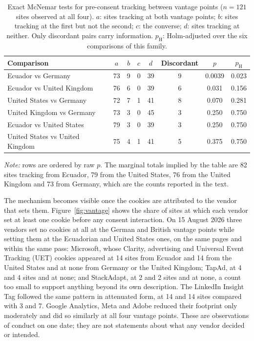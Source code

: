\documentclass[pdflatex,sn-basic,Numbered,iicol]{sn-jnl}
\theoremstyle{thmstyleone}
\theoremstyle{thmstyletwo}
\theoremstyle{thmstylethree}
\begin{document}
	\begin{table}[htbp]
		\centering
		\caption{Exact McNemar tests for pre-consent tracking between vantage points ($n=121$ sites observed at all four). $a$: sites tracking at both vantage points; $b$: sites tracking at the first but not the second; $c$: the converse; $d$: sites tracking at neither. Only discordant pairs carry information. $p_{\text{H}}$: Holm-adjusted over the six comparisons of this family.}\label{tab:vantage}
		\small
		\begin{tabular}{@{}lccccccc@{}}
			\toprule
			\textbf{Comparison} & $a$ & $b$ & $c$ & $d$ & \textbf{Discordant} & \textbf{$p$} & \textbf{$p_{\text{H}}$} \\
			\midrule
			Ecuador vs Germany & 73 & 9 & 0 & 39 & 9 & 0.0039 & 0.023 \\
			Ecuador vs United Kingdom & 76 & 6 & 0 & 39 & 6 & 0.031 & 0.156 \\
			United States vs Germany & 72 & 7 & 1 & 41 & 8 & 0.070 & 0.281 \\
			United Kingdom vs Germany & 73 & 3 & 0 & 45 & 3 & 0.250 & 0.750 \\
			Ecuador vs United States & 79 & 3 & 0 & 39 & 3 & 0.250 & 0.750 \\
			United States vs United Kingdom & 75 & 4 & 1 & 41 & 5 & 0.375 & 0.750 \\
			\bottomrule
		\end{tabular}
		\par\vspace{3pt}
		\footnotesize\RaggedRight\textit{Note:} rows are ordered by raw $p$. The marginal totals implied by the table are 82 sites tracking from Ecuador, 79 from the United States, 76 from the United Kingdom and 73 from Germany, which are the counts reported in the text.
	\end{table}
	
	The mechanism becomes visible once the cookies are attributed to the vendor that sets them. Figure~\ref{fig:vantage} shows the share of sites at which each vendor set at least one cookie before any consent interaction. On 15 August 2026 three vendors set no cookies at all at the German and British vantage points while setting them at the Ecuadorian and United States ones, on the same pages and within the same pass: Microsoft, whose Clarity, advertising and Universal Event Tracking (UET) cookies appeared at 14 sites from Ecuador and 14 from the United States and at none from Germany or the United Kingdom; TapAd, at 4 and 4 sites and at none; and StackAdapt, at 2 and 2 sites and at none, a count too small to support anything beyond its own description. The LinkedIn Insight Tag followed the same pattern in attenuated form, at 14 and 14 sites compared with 3 and 7. Google Analytics, Meta and Adobe reduced their footprint only moderately and did so similarly at all four vantage points. These are observations of conduct on one date; they are not statements about what any vendor decided or intended.
	
\end{document}
